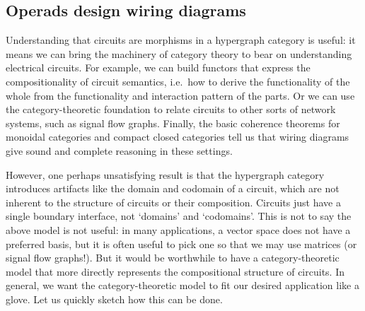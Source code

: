 \documentclass[7Sketches]{subfiles}
\begin{document}
\subsection{Operads design wiring diagrams}%
Understanding that circuits are morphisms in a hypergraph category is useful: it
means we can bring the machinery of category theory to bear on understanding
electrical circuits. For example, we can build functors that express the compositionality
of circuit semantics, i.e.\ how to derive the functionality of the whole from
the functionality and interaction pattern of the parts. Or we can use the
category-theoretic foundation to relate circuits to other sorts of network
systems, such as signal flow graphs.  Finally, the basic coherence theorems for
monoidal categories and compact closed categories tell us that wiring diagrams
give sound and complete reasoning in these settings.

However, one perhaps unsatisfying result is that the hypergraph category
introduces artifacts like the domain and codomain of a circuit, which are not
inherent to the structure of circuits or their composition. Circuits just have a
single boundary interface, not `domains' and `codomains'. This is not to say the above
model is not useful: in many applications, a vector space does not have a
preferred basis, but it is often useful to pick one so that we may use matrices
(or signal flow graphs!). But it would be worthwhile to have a
category-theoretic model that more directly represents the compositional structure
of circuits. In general, we want the category-theoretic model to fit our desired
application like a glove. Let us quickly sketch how this can be done.%
\end{document}
